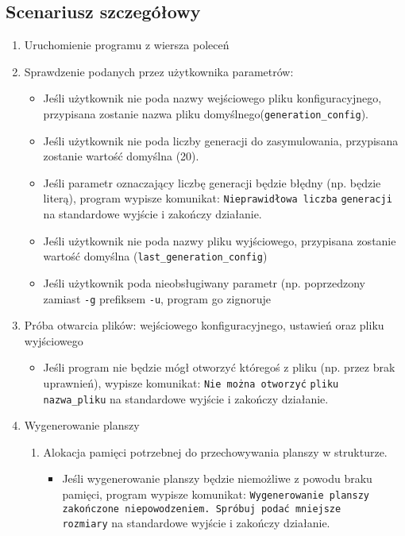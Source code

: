 \documentclass[a4paper,11pt, notitlepage ]{article}
\begin{document}
\subsection{Scenariusz szczegółowy}
\makeatletter
\renewcommand{\theenumii}{\@arabic\c@enumii}
\renewcommand{\labelenumii}{\theenumi.\theenumii}
\makeatother
\begin{enumerate}
\item Uruchomienie programu z wiersza poleceń
\item Sprawdzenie podanych przez użytkownika parametrów:
\begin{itemize}
\item Jeśli użytkownik nie poda nazwy wejściowego pliku konfiguracyjnego, przypisana zostanie nazwa pliku domyślnego\newline (\verb+generation_config+).
\item Jeśli użytkownik nie poda liczby generacji do zasymulowania, przypisana zostanie wartość domyślna (20). 
\item Jeśli parametr oznaczający liczbę generacji będzie błędny (np. będzie literą), program wypisze komunikat: \verb+Nieprawidłowa liczba+ \verb+generacji+ na standardowe wyjście i zakończy działanie.
\item Jeśli użytkownik nie poda nazwy pliku wyjściowego, przypisana zostanie wartość domyślna (\verb+last_generation_config+)
\item Jeśli użytkownik poda nieobsługiwany parametr (np. poprzedzony zamiast \verb+-g+ prefiksem \verb+-u+, program go zignoruje
\end{itemize}
\item Próba otwarcia plików: wejściowego konfiguracyjnego, ustawień oraz pliku wyjściowego
\begin{itemize}
\item Jeśli program nie będzie mógł otworzyć któregoś z pliku (np. przez brak uprawnień), wypisze komunikat: \verb+Nie można otworzyć+ \verb+pliku nazwa_pliku+ na standardowe wyjście i zakończy działanie.
\end{itemize}
\item Wygenerowanie planszy
\begin{enumerate}[label*=\arabic*.]
\item Alokacja pamięci potrzebnej do przechowywania planszy w strukturze.
\begin{itemize}
\item Jeśli wygenerowanie planszy będzie niemożliwe z powodu braku pamięci, program wypisze komunikat: \verb+Wygenerowanie planszy+ \verb+zakończone niepowodzeniem. Spróbuj podać mniejsze+ \\ \verb+rozmiary+ na standardowe wyjście i zakończy działanie.

\end{itemize}
\end{enumerate}
\end{enumerate}
\end{document}
